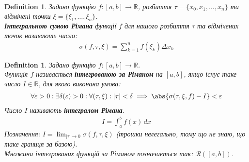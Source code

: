 \documentclass[a4paper, 10pt]{article}
\def\huge{\displaystyle}
\theoremstyle{theoremdd}
\theoremstyle{theoremdd}
\theoremstyle{theoremdd}
\newtheorem{definition}[theorem]{Definition}
\theoremstyle{theoremdd}
\theoremstyle{theoremdd}
\theoremstyle{theoremdd}
\theoremstyle{theoremdd}
\theoremstyle{theoremdd}
\theoremstyle{theoremdd}
\begin{document}
\begin{definition}
Задано функцію $f: [a,b] \to \mathbb{R}$, розбиття $\tau = \{x_0,x_1,\dots,x_n\}$ та відмічені точки $\xi = \{\xi_1, \dots, \xi_n \}$.\\
\textbf{Інтегральною сумою Рімана} функції $f$ для нашого розбиття $\tau$ та відмічених точок називають число:
\begin{align*}
\sigma (f, \tau, \xi) = \sum_{k=1}^n f(\xi_k) \Delta x_k
\end{align*}
\end{definition}

\begin{figure}[H]
\centering
{}
\end{figure}

\begin{definition}
Задано функцію $f: [a,b] \to \mathbb{R}$.\\
Функція $f$ називається \textbf{інтегрованою за Ріманом} на $[a,b]$, якщо існує таке число $I \in \mathbb{R}$, для якого виконана умова:
\begin{align*}
\forall \varepsilon > 0: \exists \delta(\varepsilon) > 0: \forall (\tau, \xi): |\tau| < \delta \implies \abs{\sigma(\tau, \xi, f) - I} < \varepsilon
\end{align*}
Число $I$ називають \textbf{інтегралом Рімана}.
\begin{align*}
I = \int_a^b f(x)\,dx
\end{align*}
Позначення: $I = \huge\lim_{|\tau| \to 0} \sigma(f, \tau, \xi)$ (трошки нелегально, тому що не знаю, що таке границя за базою).\\
Множина інтегрованих функцій за Ріманом позначається так: $\mathcal{R}([a,b])$.
\end{definition}
\end{document}
